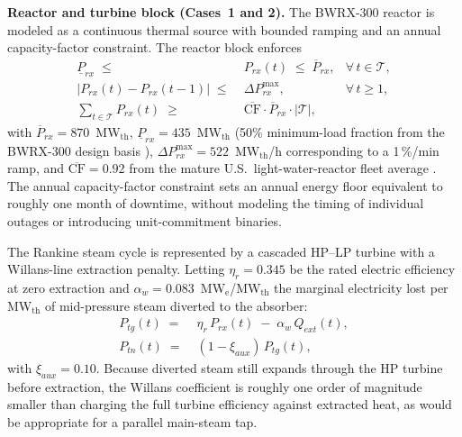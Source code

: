 \documentclass[a4paper,fleqn]{cas-sc}
\newcommand{\runinhead}[1]{\par\smallskip\noindent\textbf{#1.}\quad}
\begin{document}
\runinhead{Reactor and turbine block (Cases~1 and 2)}
The BWRX-300 reactor is modeled as a continuous thermal source with bounded ramping and an annual capacity-factor constraint. The reactor block enforces
\begin{align}
\underline{P}_{rx} \;\le\; & P_{rx}(t) \;\le\; \overline{P}_{rx}, &\forall\, t \in \mathcal{T}, \label{eq:rx_bounds}\\
\big|P_{rx}(t) - P_{rx}(t-1)\big| \;\le\; & \Delta P_{rx}^{\max}, &\forall\, t \ge 1, \label{eq:rx_ramp}\\
\sum_{t \in \mathcal{T}} P_{rx}(t) \;\ge\; & \overline{\mathrm{CF}} \cdot \overline{P}_{rx} \cdot |\mathcal{T}|, & \label{eq:rx_cf}
\end{align}
with $\overline{P}_{rx}=870$~MW$_\mathrm{th}$, $\underline{P}_{rx}=435$~MW$_\mathrm{th}$ (50\% minimum-load fraction from the BWRX-300 design basis \citep{gehitachi2024bwrx300}), $\Delta P_{rx}^{\max}=522$~MW$_\mathrm{th}$/h corresponding to a 1\,\%/min ramp, and $\overline{\mathrm{CF}}=0.92$ from the mature U.S.\ light-water-reactor fleet average \citep{eia2025capacityfactors}. The annual capacity-factor constraint sets an annual energy floor equivalent to roughly one month of downtime, without modeling the timing of individual outages or introducing unit-commitment binaries.

The Rankine steam cycle is represented by a cascaded HP--LP turbine with a Willans-line extraction penalty. Letting $\eta_r=0.345$ be the rated electric efficiency at zero extraction and $\alpha_w=0.083$~MW$_\mathrm{e}$/MW$_\mathrm{th}$ the marginal electricity lost per MW$_\mathrm{th}$ of mid-pressure steam diverted to the absorber:
\begin{align}
P_{tg}(t) \;=\; & \eta_r\, P_{rx}(t) \;-\; \alpha_w\, Q_{ext}(t), \label{eq:turb_willans}\\
P_{tn}(t) \;=\; & (1 - \xi_{aux})\, P_{tg}(t), \label{eq:turb_aux}
\end{align}
with $\xi_{aux}=0.10$. Because diverted steam still expands through the HP turbine before extraction, the Willans coefficient is roughly one order of magnitude smaller than charging the full turbine efficiency against extracted heat, as would be appropriate for a parallel main-steam tap.
\end{document}
